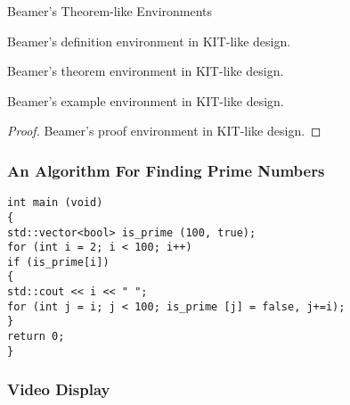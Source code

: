 \documentclass[
 UKenglish%
 ]{beamer}%
\begin{document}
\begin{frame}{Beamer's Theorem-like Environments}
  \begin{definition}%
    Beamer's definition environment in KIT-like design.
  \end{definition}

  \begin{theorem}%
    Beamer's theorem environment in KIT-like design.
  \end{theorem}

  \begin{example}
    Beamer's example environment in KIT-like design.
  \end{example}

  \begin{proof}%
    Beamer's proof environment in KIT-like design.
  \end{proof}
\end{frame}

\begin{frame}[fragile]%
  \frametitle{An Algorithm For Finding Prime Numbers}
\begin{verbatim}
int main (void)
{
std::vector<bool> is_prime (100, true);
for (int i = 2; i < 100; i++)
if (is_prime[i])
{
std::cout << i << " ";
for (int j = i; j < 100; is_prime [j] = false, j+=i);
}
return 0;
}
\end{verbatim}
\end{frame}

\begin{frame}
  \frametitle{Video Display}
  \centering
\end{frame}
\end{document}
